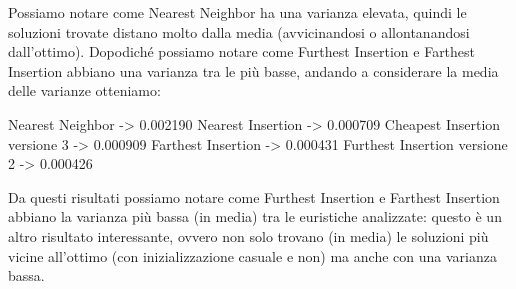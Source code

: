 \documentclass[a4paper,12pt]{report}
\begin{document}
Possiamo notare come Nearest Neighbor ha una varianza elevata, quindi le soluzioni trovate distano molto dalla media (avvicinandosi o allontanandosi dall'ottimo). Dopodiché possiamo notare come Furthest Insertion e Farthest Insertion abbiano una varianza tra le più basse, andando a considerare la media delle varianze otteniamo:
\begin{myverbatim}
Nearest Neighbor ->              0.002190
Nearest Insertion ->             0.000709
Cheapest Insertion versione 3 -> 0.000909
Farthest Insertion ->            0.000431
Furthest Insertion versione 2 -> 0.000426
\end{myverbatim}
Da questi risultati possiamo notare come Furthest Insertion e Farthest Insertion abbiano la varianza più bassa (in media) tra le euristiche analizzate: questo è un altro risultato interessante, ovvero non solo trovano (in media) le soluzioni più vicine all'ottimo (con inizializzazione casuale e non) ma anche con una varianza bassa.
\end{document}
